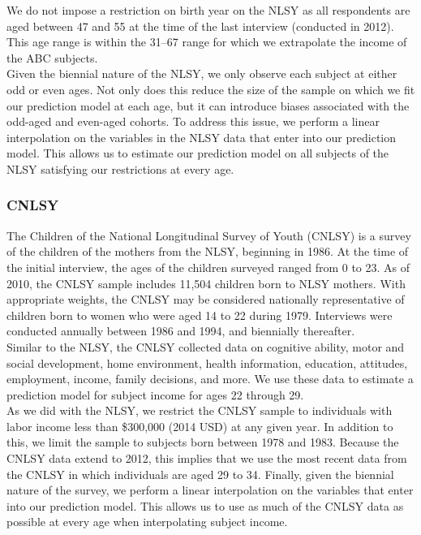 \noindent We do not impose a restriction on birth year on the NLSY as all respondents are aged between 47 and 55
at the time of the last interview (conducted in 2012). This age range is within the 31--67 range for which
we extrapolate the income of the ABC subjects. \\

\noindent Given the biennial nature of the NLSY, we only observe each subject at either odd or even
ages. Not only does this reduce the size of the sample on which we fit our prediction model
at each age, but it can introduce biases associated with the odd-aged and even-aged cohorts.
To address this issue, we perform a linear interpolation on the variables in the NLSY data
that enter into our prediction model. This allows us to estimate our prediction model on
all subjects of the NLSY satisfying our restrictions at every age. \\

\subsubsection{CNLSY}
\label{app:subject_income_cnlsy}

\noindent The Children of the National Longitudinal Survey of Youth (CNLSY) is a survey of the children of the mothers from the NLSY, beginning in 1986. At the time of
the initial interview, the ages of the children surveyed ranged from 0 to 23. As of 2010,
the CNLSY sample includes 11,504 children born to NLSY mothers. With appropriate weights,
the CNLSY may be considered nationally representative of children born to women
who were aged 14 to 22 during 1979. Interviews were conducted annually between 1986 and 1994,
and biennially thereafter. \\

\noindent Similar to the NLSY, the CNLSY collected data on cognitive ability, motor and social development,
home environment, health information, education, attitudes, employment, income, family decisions,
and more. We use these data to estimate a prediction model for subject income for ages
22 through 29. \\

\noindent As we did with the NLSY, we restrict the CNLSY sample to individuals with labor income less than
\$300,000 (2014 USD) at any given year. In addition to this, we limit the sample to subjects born
between 1978 and 1983. Because the CNLSY data extend to 2012, this implies that we use the most
recent data from the CNLSY in which individuals are aged 29 to 34. Finally, given the biennial
nature of the survey, we perform a linear interpolation on the variables that enter into our prediction
model. This allows us to use as much of the CNLSY data as possible at every age when
interpolating subject income. \\

